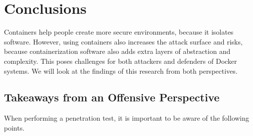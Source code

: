 \chapter{Conclusions}\label{chapter:conclusions}
Containers help people create more secure environments, because it isolates software. However, using containers also increases the attack surface and risks, because containerization software also adds extra layers of abstraction and complexity. This poses challenges for both attackers and defenders of Docker systems. We will look at the findings of this research from both perspectives.

\section{Takeaways from an Offensive Perspective}
When performing a penetration test, it is important to be aware of the following points.
